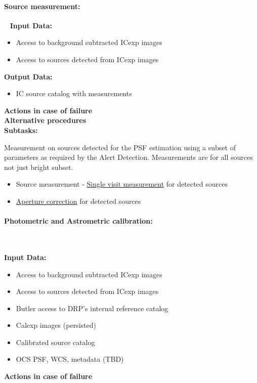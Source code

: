 \paragraph{Source measurement:}~
\label{sec:apSourcemeasurement}
\noindent
{\bf Input Data:}\\
\begin{itemize}
\item Access to background subtracted ICexp images
\item Access to sources detected from ICexp images
\end{itemize}
{\bf Output Data:}\\
\begin{itemize}
\item IC source catalog with measurements
\end{itemize}
 {\bf Actions in case of failure}\\
{\bf Alternative procedures}\\

\noindent
{\bf Subtasks:}

Measurement on sources detected for the PSF estimation using a subset
of parameters as required by the Alert Detection. Measurements are for
all sources not just bright subset.
\begin{itemize}
\item  Source measurement - \hyperref[sec:measurement]{Single visit
    measurement} for detected sources
\item  \hyperref[sec:apertureCorrection]{Aperture correction} for
  detected sources
\end{itemize}

\paragraph{Photometric and Astrometric calibration:}~

\noindent
{\bf Input Data:}\\
\begin{itemize}
\item Access to background subtracted ICexp images
\item Access to sources detected from ICexp images
\item Butler access to DRP's internal reference catalog 
\end{itemize}
\begin{itemize}
\item  Calexp images (persisted)
\item Calibrated source catalog
\item OCS PSF, WCS, metadata (TBD) 
\end{itemize}
 {\bf Actions in case of failure}\\

